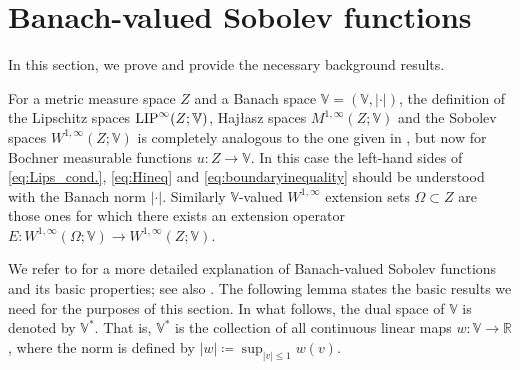 \documentclass[reqno]{amsart}
\newcommand{\LIP}{{\rm LIP}}
\numberwithin{equation}{section}
\theoremstyle{remark}
\begin{document}
\section{Banach-valued Sobolev functions}\label{sec:banach}
In this section, we prove  and provide the necessary background results.

For a metric measure space $Z$ and a Banach space $\mathbb V=(\mathbb V, |\cdot|)$, the definition of the Lipschitz spaces $\LIP^{\infty}(Z;\mathbb V)$, Haj{\l}asz spaces $M^{1,\infty}(Z;\mathbb V)$ and the Sobolev spaces $W^{1,\infty}(Z;\mathbb V)$ is completely analogous to the one given in , but now for Bochner measurable functions $u\colon Z\to\mathbb V$. In this case the left-hand sides of \eqref{eq:Lips_cond.}, \eqref{eq:Hineq} and \eqref{eq:boundaryinequality} should be understood with the Banach norm $|\cdot|$. Similarly $\mathbb V$-valued $W^{1,\infty}$ extension sets $\Omega\subset Z$ are those ones for which there exists an extension operator $E\colon W^{1,\infty}(\Omega;\mathbb V)\to W^{1,\infty}(Z;\mathbb V)$.

We refer to \cite{HKST2001,HKST2015} for a more detailed explanation of Banach-valued Sobolev functions and its basic properties; see also \cite{Garc:Iko:Zhu:23}. The following lemma states the basic results we need for the purposes of this section. In what follows, the dual space of $\mathbb{V}$ is denoted by $\mathbb{V}^{*}$. That is, $\mathbb{V}^{*}$ is the collection of all continuous linear maps $w \colon \mathbb{V} \rightarrow \mathbb{R}$, where the norm is defined by $|w| \coloneqq \sup_{ |v| \leq 1 } w(v)$.
\end{document}
